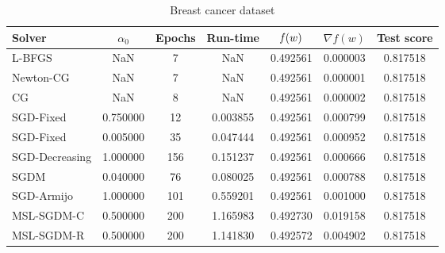 \begin{table}
\centering
\caption{Breast cancer dataset}
\label{tab:breast-tab}
\begin{tabular}{lS[round-precision=3]S[drop-zero-decimal]S[round-precision=4]S[round-precision=6]S[exponent-mode=scientific]S[round-precision=6]}
\toprule
Solver & {$\alpha_0$} & {Epochs} & {Run-time} & {$\operatorname*{\mathit{f}}(w)$} & {$\nabla f(w)$} & {Test score} \\
\midrule
L-BFGS & NaN & 7 & NaN & 0.492561 & 0.000003 & 0.817518 \\
Newton-CG & NaN & 7 & NaN & 0.492561 & 0.000001 & 0.817518 \\
CG & NaN & 8 & NaN & 0.492561 & 0.000002 & 0.817518 \\
SGD-Fixed & 0.750000 & 12 & 0.003855 & 0.492561 & 0.000799 & 0.817518 \\
SGD-Fixed & 0.005000 & 35 & 0.047444 & 0.492561 & 0.000952 & 0.817518 \\
SGD-Decreasing & 1.000000 & 156 & 0.151237 & 0.492561 & 0.000666 & 0.817518 \\
SGDM & 0.040000 & 76 & 0.080025 & 0.492561 & 0.000788 & 0.817518 \\
SGD-Armijo & 1.000000 & 101 & 0.559201 & 0.492561 & 0.001000 & 0.817518 \\
MSL-SGDM-C & 0.500000 & 200 & 1.165983 & 0.492730 & 0.019158 & 0.817518 \\
MSL-SGDM-R & 0.500000 & 200 & 1.141830 & 0.492572 & 0.004902 & 0.817518 \\
\bottomrule
\end{tabular}
\end{table}

